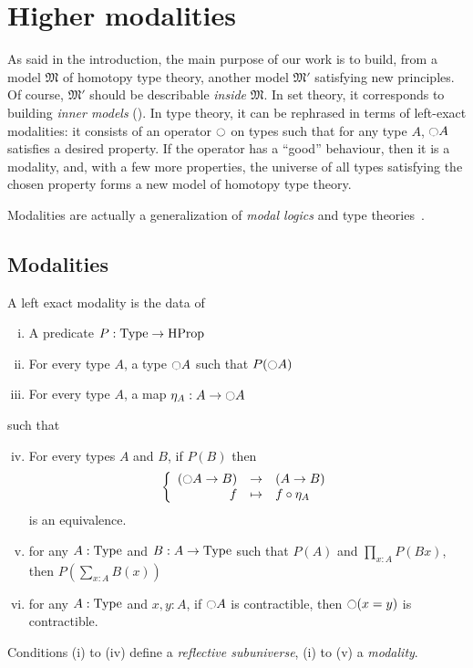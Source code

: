 \chapter{Higher modalities}
\label{chap:modalities}

As said in the introduction, the main purpose of our work is to build,
from a model $\mathfrak M$ of homotopy type theory, another model
$\mathfrak M'$ satisfying new principles. Of course, $\mathfrak M'$
should be describable {\em inside} $\mathfrak M$. In set theory, it
corresponds to building {\em inner models} (\cite{kunen}).%
%
In type theory, it can be rephrased in terms of left-exact modalities:
it consists of an operator $\ocircle$ on types such that for any type
$A$, $\ocircle A$ satisfies a desired property. If the operator has a
``good'' behaviour, then it is a modality, and, with a few more
properties, the universe of all types satisfying the chosen property
forms a new model of homotopy type theory.

Modalities are actually a generalization of {\em modal logics} and
{\modal type theories}~\cite{moggi-monad}.

\section{Modalities}
\label{sec:modalities}

\begin{defi}
  \label{def:modality}
  A left exact modality is the data of
  \begin{enumerate}[(i)]
  \item A predicate $P:\operatorname{Type} \to \operatorname{HProp}$
  \item For every type $A$, a type
    $\ocircle A$ such that $P(\ocircle A)$
  \item For every type $A$, a map $\eta_A:A \to
    \ocircle A$
  \end{enumerate}
  such that
  \begin{enumerate}[(i)]
    \setcounter{enumi}{3}
  \item For every types $A$ and $B$, if $P(B)$ then
    \[ \left\{
        \begin{array}{rcl}
          (\ocircle A \to B) & \to & (A \to B) \\
          f & \mapsto & f \circ \eta_A
        \end{array} \right. \] %
    is an equivalence.
  \item for any $A:\operatorname{Type}$ and $B:A \to \operatorname{Type}$ such that $P(A)$
    and $\prod_{x:A} P(B x)$, then $P\left( \sum_{x:A} B(x)\right)$
  \item for any $A:\operatorname{Type}$ and $x,y:A$, if $\ocircle A$ is
    contractible, then $\ocircle (x=y)$ is contractible.
  \end{enumerate}
  Conditions (i) to (iv) define a {\em reflective subuniverse}, (i) to
  (v) a {\em modality}.
\end{defi}


